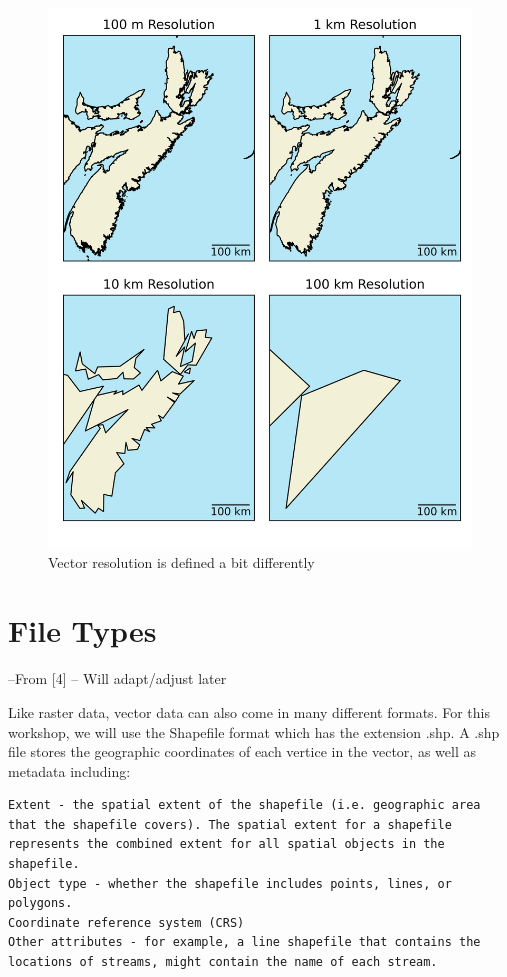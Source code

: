 \documentclass[
]{book}
\begin{document}
\begin{figure}
\centering
\includegraphics{images/03-vector-resolution.png}
\caption{Vector resolution is defined a bit differently}
\end{figure}

\hypertarget{file-types-1}{%
\section{File Types}\label{file-types-1}}

--From {[}4{]} -- Will adapt/adjust later

Like raster data, vector data can also come in many different formats. For this workshop, we will use the Shapefile format which has the extension .shp. A .shp file stores the geographic coordinates of each vertice in the vector, as well as metadata including:

\begin{verbatim}
Extent - the spatial extent of the shapefile (i.e. geographic area that the shapefile covers). The spatial extent for a shapefile represents the combined extent for all spatial objects in the shapefile.
Object type - whether the shapefile includes points, lines, or polygons.
Coordinate reference system (CRS)
Other attributes - for example, a line shapefile that contains the locations of streams, might contain the name of each stream.
\end{verbatim}
\end{document}
